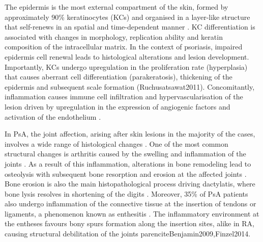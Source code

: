 The epidermis is the most external compartment of the skin, formed by approximately 90\% keratinocytes (KCs) and organised in a layer-like structure that self-renews in an spatial and time-dependent manner \parencite{Wikramanayake2014}. KC differentiation is associated with changes in morphology, replication ability and keratin composition of the intracellular matrix. In the context of psoriasis, impaired epidermis cell renewal leads to histological alterations and lesion development. Importantly, KCs undergo upregulation in the proliferation rate (hyperplasia) that causes aberrant cell differentiation (parakeratosis), thickening of the epidermis and subsequent scale formation (Ruchusatsawat2011). Concomitantly, inflammation causes immune cell infiltration and hypervascularisation of the lesion driven by upregulation in the expression of angiogenic factors and activation of the endothelium \parencite{Perera2012}.  

In PsA, the joint affection, arising after skin lesions in the majority of the cases, involves a wide range of histological changes \parencite{Haddad2013}. One of the most common structural changes is arthritis caused by the swelling and inflammation of the joints \parencite{Schett2011}. As a result of this inflammation, alterations in bone remodeling lead to osteolysis with subsequent bone resorption and erosion at the affected joints \parencite{Mensah2017}. Bone erosion is also the main histopathological process driving dactylatis, where bone lysis resolves in shortening of the digits \parencite{Gladman2005}. Moreover, 35\% of PsA patients also undergo inflammation of the connective tissue at the insertion of tendons or ligaments, a phenomenon known as enthesitis \parencite{McGonagle2011,Polachek2017}. The inflammatory environment at the entheses favours bony spurs formation along the insertion sites, alike in RA, causing structural debilitation of the joints parencite{Benjamin2009,Finzel2014}.

 



